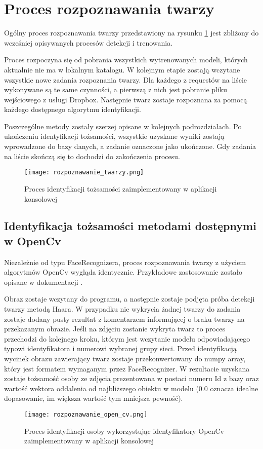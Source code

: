 \section{Proces rozpoznawania twarzy}
Ogólny proces rozpoznawania twarzy przedstawiony na rysunku \ref{fig:rozpoznawanie_proces} jest zbliżony do wcześniej opisywanych procesów detekcji i trenowania. 

Proces rozpoczyna się od pobrania wszystkich wytrenowanych modeli, których aktualnie nie ma w lokalnym katalogu. W kolejnym etapie zostają wczytane wszystkie nowe zadania rozpoznania twarzy. Dla każdego z requestów na liście wykonywane są te same czynności, a pierwszą z nich jest pobranie pliku wejściowego z usługi Dropbox. Następnie twarz zostaje rozpoznana za pomocą każdego dostępnego algorytmu identyfikacji. 

Poszczególne metody zostały szerzej opisane w kolejnych podrozdziałach. Po ukończeniu identyfikacji tożsamości, wszystkie uzyskane wyniki zostają wprowadzone do bazy danych, a zadanie oznaczone jako ukończone. Gdy zadania na liście skończą się to dochodzi do zakończenia procesu.
\begin{figure}[H]
	\centering
	\texttt{[image: rozpoznawanie\_twarzy.png]}
	\caption{Proces identyfikacji tożsamości zaimplementowany w aplikacji konsolowej}
	\label{fig:rozpoznawanie_proces}
\end{figure}

\subsection{Identyfikacja tożsamości metodami dostępnymi w OpenCv}
Niezależnie od typu FaceRecognizera, proces rozpoznawania twarzy z użyciem algorytmów OpenCv wygląda identycznie. Przykładowe zastosowanie zostało opisane w dokumentacji \cite{opencv_doc}. 

Obraz zostaje wczytany do programu, a następnie zostaje podjęta próba detekcji twarzy metodą Haara. W przypadku nie wykrycia żadnej twarzy do zadania zostaje dodany pusty rezultat z komentarzem informującej o braku twarzy na przekazanym obrazie. 
Jeśli na zdjęciu zostanie wykryta twarz to proces przechodzi do kolejnego kroku, którym jest wczytanie modelu odpowiadającego typowi identyfikatora i numerowi wybranej grupy sieci. Przed identyfikacją wycinek obrazu zawierający twarz zostaje przekonwertowany do numpy array, który jest formatem wymaganym przez FaceRecognizer. W rezultacie uzyskana zostaje tożsamość osoby ze zdjęcia prezentowana w postaci numeru Id z bazy oraz wartość wektora oddalenia od najbliższego obiektu w modelu (0.0 oznacza idealne dopasowanie, im większa wartość tym mniejsza pewność). 
\begin{figure}[H]
	\centering
	\texttt{[image: rozpoznawanie\_open\_cv.png]}
	\caption{Proces identyfikacji osoby wykorzystując identyfikatory OpenCv zaimplementowany w aplikacji konsolowej}
	\label{fig:rozpoznawanie_open_cv}
\end{figure}

